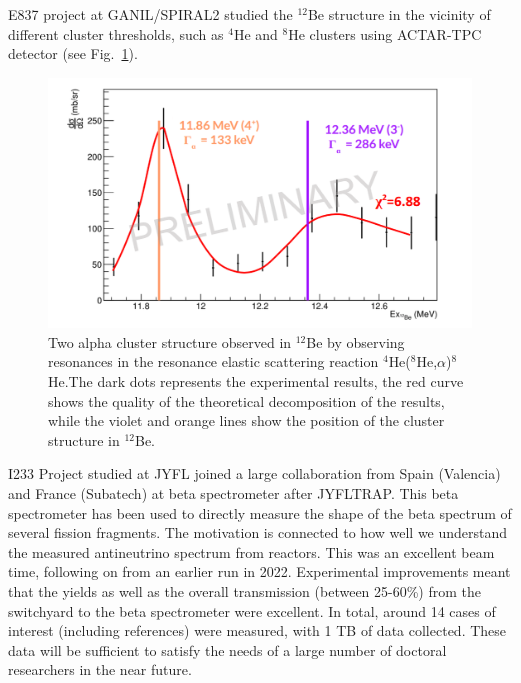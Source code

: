 E837 project at GANIL/SPIRAL2 studied the $^{12}$Be structure in the vicinity of different cluster thresholds, such as $^4$He and $^8$He clusters using ACTAR-TPC detector (see Fig.~\ref{fig:2alpha_cluster}). 

\begin{figure}[!h]
    \centering
    \includegraphics[width=0.7\linewidth]{graphics/2alpha_cluster.png}
    \caption{Two alpha cluster structure observed in $^{12}$Be by observing resonances in the resonance elastic scattering reaction $^4$He($^8$He,$\alpha$)$^8$He.The dark dots represents the experimental results, the red curve shows the quality of the theoretical decomposition of the results, while the violet and orange lines show the position of the cluster structure in $^{12}$Be.
}
    \label{fig:2alpha_cluster}
\end{figure}

I233 Project studied at JYFL joined a large collaboration from Spain (Valencia) and France (Subatech) at beta spectrometer after JYFLTRAP. This beta spectrometer has been used to directly measure the shape of the beta spectrum of several fission fragments. The motivation is connected to how well we understand the measured antineutrino spectrum from reactors.
This was an excellent beam time, following on from an earlier run in 2022. Experimental improvements meant that the yields as well as the overall transmission (between 25-60\%) from the switchyard to the beta spectrometer were excellent. In total, around 14 cases of interest (including references) were measured, with 1 TB of data collected. These data will be sufficient to satisfy the needs of a large number of doctoral researchers in the near future.


